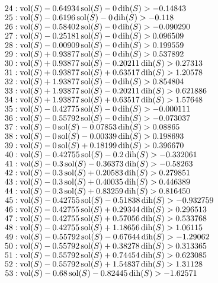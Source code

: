 $24:  \vol(S) - 0.64934 \sol(S) - 0 \dih(S) > -0.14843$\newline
$25:  \vol(S) - 0.6196 \sol(S) - 0 \dih(S) > -0.118$\newline
$26:  \vol(S) - 0.58402 \sol(S) - 0 \dih(S) > -0.090290$\newline
$27:  \vol(S) - 0.25181 \sol(S) - 0 \dih(S) > 0.096509$\newline
$28:  \vol(S) - 0.00909 \sol(S) - 0 \dih(S) > 0.199559$\newline
$29:  \vol(S) + 0.93877 \sol(S) - 0 \dih(S) > 0.537892$\newline
$30:  \vol(S) + 0.93877 \sol(S) - 0.20211 \dih(S) > 0.27313$\newline
$31:  \vol(S) + 0.93877 \sol(S) + 0.63517 \dih(S) > 1.20578$\newline
$32:  \vol(S) + 1.93877 \sol(S) - 0 \dih(S) > 0.854804$\newline
$33:  \vol(S) + 1.93877 \sol(S) - 0.20211 \dih(S) > 0.621886$\newline
$34:  \vol(S) + 1.93877 \sol(S) + 0.63517 \dih(S) > 1.57648$\newline
$35:  \vol(S) - 0.42775 \sol(S) - 0 \dih(S) > -0.000111$\newline
$36:  \vol(S) - 0.55792 \sol(S) - 0 \dih(S) > -0.073037$\newline
$37:  \vol(S) - 0 \sol(S) - 0.07853 \dih(S) > 0.08865$\newline
$38:  \vol(S) - 0 \sol(S) - 0.00339 \dih(S) > 0.198693$\newline
$39:  \vol(S) - 0 \sol(S) + 0.18199 \dih(S) > 0.396670$\newline
$40:  \vol(S) - 0.42755 \sol(S) - 0.2 \dih(S) > -0.332061$\newline
$41:  \vol(S) - 0.3 \sol(S) - 0.36373 \dih(S) > -0.58263$\newline
$42:  \vol(S) - 0.3 \sol(S) + 0.20583 \dih(S) > 0.279851$\newline
$43:  \vol(S) - 0.3 \sol(S) + 0.40035 \dih(S) > 0.446389$\newline
$44:  \vol(S) - 0.3 \sol(S) + 0.83259 \dih(S) > 0.816450$\newline
$45:  \vol(S) - 0.42755 \sol(S) - 0.51838 \dih(S) > -0.932759$\newline
$46:  \vol(S) - 0.42755 \sol(S) + 0.29344 \dih(S) > 0.296513$\newline
$47:  \vol(S) - 0.42755 \sol(S) + 0.57056 \dih(S) > 0.533768$\newline
$48:  \vol(S) - 0.42755 \sol(S) + 1.18656 \dih(S) > 1.06115$\newline
$49:  \vol(S) - 0.55792 \sol(S) - 0.67644 \dih(S) > -1.29062$\newline
$50:  \vol(S) - 0.55792 \sol(S) + 0.38278 \dih(S) > 0.313365$\newline
$51:  \vol(S) - 0.55792 \sol(S) + 0.74454 \dih(S) > 0.623085$\newline
$52:  \vol(S) - 0.55792 \sol(S) + 1.54837 \dih(S) > 1.31128$\newline
$53:  \vol(S) - 0.68 \sol(S) - 0.82445 \dih(S) > -1.62571$\newline
\smallskip


